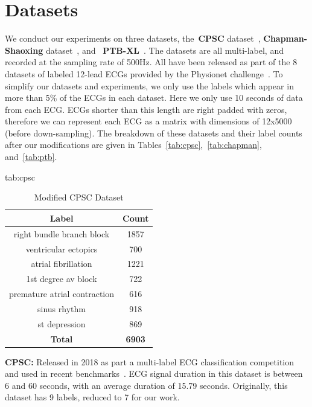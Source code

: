 \documentclass[pmlr,twocolumn]{jmlr}%
\begin{document}
\section{Datasets}
\label{datasets}

We conduct our experiments on three datasets, the~\textbf{CPSC} dataset~\citep{liu2018open}, \textbf{Chapman-Shaoxing} dataset~\citep{zheng202012}, and ~\textbf{PTB-XL}~\citep{wagner2020ptb}. The datasets are all multi-label, and recorded at the sampling rate of 500Hz. All have been released as part of the 8 datasets of labeled 12-lead ECGs provided by the Physionet challenge~\citep{reyna2021will,reyna4issues}.
To simplify our datasets and experiments, we only use the labels which appear in more than 5\% of the ECGs in each dataset. Here we only use 10 seconds of data from each ECG. ECGs shorter than this length are right padded with zeros, therefore we can represent each ECG as a matrix with dimensions of 12x5000 (before down-sampling).
The breakdown of these datasets and their label counts after our modifications are given in Tables~\ref{tab:cpsc},~\ref{tab:chapman}, and~\ref{tab:ptb}.

\begin{table}[htbp]
\floatconts
  {tab:cpsc}%
  {\caption{Modified CPSC Dataset}}%
  {
\begin{tabular}{|c|c|}
 \hline
Label & Count \\
 \hline
right bundle branch block    &  1857 \\
ventricular ectopics         &   700 \\
atrial fibrillation          &  1221 \\
1st degree av block          &   722 \\
premature atrial contraction &   616 \\
sinus rhythm                 &   918 \\
st depression                &   869 \\
 \hline
\textbf{Total} & \textbf{6903}\\
\hline
\end{tabular}
  }
\end{table}



\textbf{CPSC:} Released in 2018 as part a multi-label ECG classification competition~\citep{liu2018open} and used in recent benchmarks~\citep{strodthoff2020deep}. ECG signal duration in this dataset is between 6 and 60 seconds, with an average duration of 15.79 seconds. Originally, this dataset has 9 labels, reduced to 7 for our work.
\end{document}
